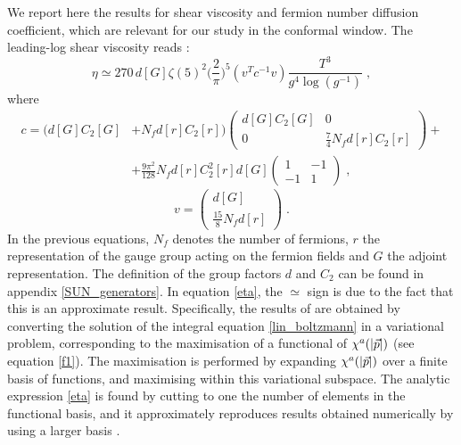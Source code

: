 We report here the results for shear viscosity and fermion number diffusion coefficient, which are relevant for our study in the conformal window. The leading-log shear viscosity reads \cite{Arnold:2000dr}:
 \begin{equation}   
\eta \simeq 270 \, d [G] \zeta(5)^2 \biggl( \frac{2}{\pi} \biggr)^5 (v^T c^{-1} v) \frac{T^3}{g^4 \log( g^{-1})}\;,
\label{eta}
\end{equation}
%
where  
\begin{equation}
\begin{split}
c =  (d [G] C_2 [G]  & + N_f d [r] C_2 [r])
\begin{pmatrix}
d [G] C_2 [G] & 0 \\
0 & \frac{7}{4} N_f d [r] C_2 [r]
\end{pmatrix}
+  \\
& + \frac{9 \pi^2}{128} N_f d [r] C_2^2 [r] d [G]
\begin{pmatrix}
1 & -1 \\
-1 & 1
\end{pmatrix} \;,
\end{split}
\label{c_visc}
\end{equation}
\begin{equation}
v = 
\begin{pmatrix}
d [G] \\
\frac{15}{8} N_f d [r]
\end{pmatrix} \; .
\label{v_visc}
\end{equation}
%
In the previous equations, $N_f$ denotes the number of fermions, $r$ the representation of the gauge group acting on the fermion fields and $G$ the adjoint representation. The definition of the group factors $d$ and $C_2$ can be found in appendix \ref{SUN_generators}. In equation \ref{eta}, the $\simeq$ sign is due to the fact that this is an approximate result. Specifically,  the results of \cite{Arnold:2000dr,Arnold:2003zc} are obtained by converting the solution of the integral equation \ref{lin_boltzmann} in a variational problem, corresponding to the maximisation of a functional of $\chi^a(\abs{\vec p})$ (see equation \ref{f1}). The maximisation is performed by expanding $\chi^a(\abs{\vec p})$ over a finite basis of functions, and maximising within this variational subspace. The analytic expression \ref{eta} is found by cutting to one the number of elements in the functional basis, and it approximately reproduces results obtained numerically by using a larger basis \cite{Arnold:2000dr}.


